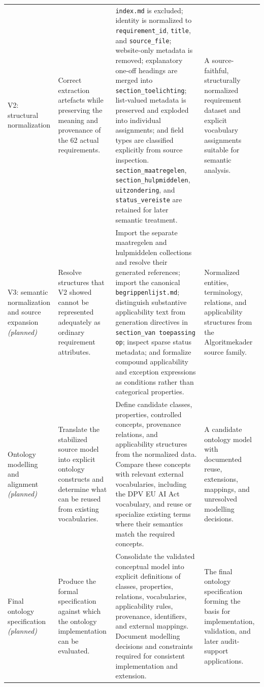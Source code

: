 \begin{longtable}{
    P{0.14\textwidth}
    P{0.22\textwidth}
    P{0.36\textwidth}
    P{0.20\textwidth}
}
V2: structural normalization &
Correct extraction artefacts while preserving the meaning and provenance of the 62 actual requirements. &
\texttt{index.md} is excluded; identity is normalized to \texttt{requirement\_id}, \texttt{title}, and \texttt{source\_file}; website-only metadata is removed; explanatory one-off headings are merged into \texttt{section\_toelichting}; list-valued metadata is preserved and exploded into individual assignments; and field types are classified explicitly from source inspection. \texttt{section\_maatregelen}, \texttt{section\_hulpmiddelen}, \texttt{uitzondering}, and \texttt{status\_vereiste} are retained for later semantic treatment. &
A source-faithful, structurally normalized requirement dataset and explicit vocabulary assignments suitable for semantic analysis. \\

V3: semantic normalization and source expansion \textit{(planned)} &
Resolve structures that V2 showed cannot be represented adequately as ordinary requirement attributes. &
Import the separate maatregelen and hulpmiddelen collections and resolve their generated references; import the canonical \texttt{begrippenlijst.md}; distinguish substantive applicability text from generation directives in \texttt{section\_van toepassing op}; inspect sparse status metadata; and formalize compound applicability and exception expressions as conditions rather than categorical properties. &
Normalized entities, terminology, relations, and applicability structures from the Algoritmekader source family. \\

Ontology modelling and alignment \textit{(planned)} &
Translate the stabilized source model into explicit ontology constructs and determine what can be reused from existing vocabularies. &
Define candidate classes, properties, controlled concepts, provenance relations, and applicability structures from the normalized data. Compare these concepts with relevant external vocabularies, including the DPV EU AI Act vocabulary, and reuse or specialize existing terms where their semantics match the required concepts. &
A candidate ontology model with documented reuse, extensions, mappings, and unresolved modelling decisions. \\

Final ontology specification \textit{(planned)} &
Produce the formal specification against which the ontology implementation can be evaluated. &
Consolidate the validated conceptual model into explicit definitions of classes, properties, relations, vocabularies, applicability rules, provenance, identifiers, and external mappings. Document modelling decisions and constraints required for consistent implementation and extension. &
The final ontology specification forming the basis for implementation, validation, and later audit-support applications. \\

\end{longtable}
\endgroup
